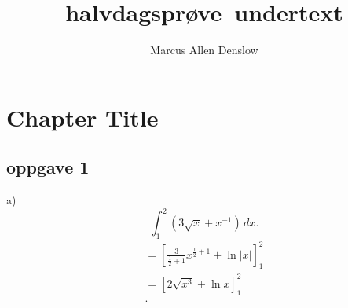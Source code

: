 \documentclass{report}
\title{\Huge{halvdagsprøve}\ undertext}
\author{\Huge{Marcus Allen Denslow}}
\date{}
\begin{document}
\maketitle
\newpage%
\tableofcontents
\pagebreak

\chapter{Chapter Title}
\section{oppgave 1}
a)
\[
\int_{1}^{2} \left( 3 \sqrt{x} + x^{-1} \right)  \, dx 
.\] 
\begin{align*}
	= \left[ \frac{3}{\frac{1}{2} + 1} x^{\frac{1}{2} + 1} + \ln |x| \right]_{1}^{2} \\
	= \left[ 2 \sqrt{x^3} + \ln x  \right]_{1}^{2} \\
.\end{align*}
\end{document}
